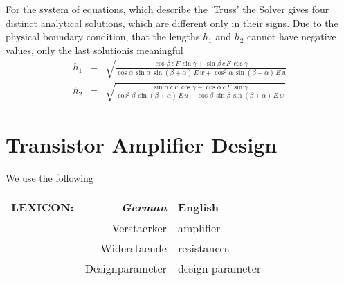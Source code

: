 For the system of equations, which describe the 
 'Truss' the 
Solver gives four distinct analytical solutions, which are different only in their signs. 
Due to the physical boundary condition, that the lengths
$h_1$ and $h_2$ cannot have negative values, only the last solutionis  meaningful
\begin{eqnarray}
h_1 &=& \sqrt{
  \frac{
    \cos \beta \, c \, F \, \sin \gamma + \sin \beta \, c \, F \, 
    \cos \gamma
  }{
    \cos \alpha \, \sin \alpha \, \sin \left( \beta + \alpha \right) \, 
    E \, w + \cos^2 \alpha \, \sin \left( \beta + \alpha \right) \, E \, 
    u
  }
} \\
h_2 &=& \sqrt{
  \frac{
    \sin \alpha \, c \, F \, \cos \gamma - \cos \alpha \, c \, F \, 
    \sin \gamma
  }{
    \cos^2 \beta \, \sin \left( \beta + \alpha \right) \, E \, u
    - \cos \beta \, \sin \beta \, \sin \left( \beta + \alpha \right) \, 
    E \, w
  }
}
\end{eqnarray}

\clearpage
\section{Transistor Amplifier Design}

We use the following

\begin{center}
\begin {tabular} {r r | l  }
{\sf LEXICON:} & {\it\color{black} German} & {\color{blue} English }  \\
\hline
   & Verstaerker & \color{blue} amplifier \\
     &  Widerstaende &  \color{blue} resistances \\
          &  Designparameter &  \color{blue} design parameter 
\end {tabular}
\end{center}



